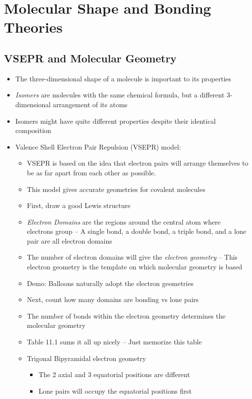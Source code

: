 \documentclass[12pt, openany, letterpaper]{memoir}
\begin{document}
\chapter{Molecular Shape and Bonding Theories}
\section{VSEPR and Molecular Geometry}
\begin{itemize}
	\item The three-dimensional shape of a molecule is important to its properties
	\item \emph{Isomers} are molecules with the same chemical formula, but a different 3-dimensional arrangement of its atoms
	\item Isomers might have quite different properties despite their identical composition
	\item Valence Shell Electron Pair Repulsion (VSEPR) model:
	\begin{itemize}
		\item VSEPR is based on the idea that electron pairs will arrange themselves to be as far apart from each other as possible.
		\item This model gives accurate geometries for covalent molecules
		\item First, draw a good Lewis structure
		\item \emph{Electron Domains} are the regions around the central atom where electrons group -- A single bond, a double bond, a triple bond, and a lone pair are all electron domains
		\item The number of electron domains will give the \emph{electron geometry} -- This electron geometry is the template on which molecular geometry is based
		\item Demo: Balloons naturally adopt the electron geometries
		\item Next, count how many domains are bonding vs lone pairs
		\item The number of bonds within the electron geometry determines the molecular geometry
		\item Table 11.1 sums it all up nicely -- Just memorize this table
		\item Trigonal Bipyramidal electron geometry
		\begin{itemize}
			\item The 2 axial and 3 equatorial positions are different
			\item Lone pairs will occupy the equatorial positions first

\end{itemize}
\end{itemize}
\end{itemize}
\end{document}
